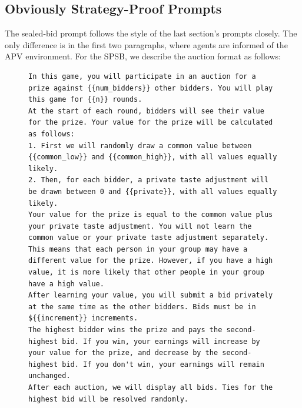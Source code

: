 \documentclass{article} %
\begin{document}
\subsection{Obviously Strategy-Proof Prompts}\label{sec:osp-prompts}
The sealed-bid prompt follows the style of the last section's prompts closely. The only difference is in the first two paragraphs, where agents are informed of the APV environment. For the SPSB, we describe the auction format as follows:
\begin{figure}
\centering
\begin{minipage}{0.95\textwidth}
\begin{lstlisting}
In this game, you will participate in an auction for a prize against {{num_bidders}} other bidders. You will play this game for {{n}} rounds.
At the start of each round, bidders will see their value for the prize. Your value for the prize will be calculated as follows:
1. First we will randomly draw a common value between {{common_low}} and {{common_high}}, with all values equally likely.
2. Then, for each bidder, a private taste adjustment will be drawn between 0 and {{private}}, with all values equally likely.
Your value for the prize is equal to the common value plus your private taste adjustment. You will not learn the common value or your private taste adjustment separately. This means that each person in your group may have a different value for the prize. However, if you have a high value, it is more likely that other people in your group have a high value.
After learning your value, you will submit a bid privately at the same time as the other bidders. Bids must be in ${{increment}} increments.
The highest bidder wins the prize and pays the second-highest bid. If you win, your earnings will increase by your value for the prize, and decrease by the second-highest bid. If you don't win, your earnings will remain unchanged.
After each auction, we will display all bids. Ties for the highest bid will be resolved randomly.
\end{lstlisting}
\end{minipage}
\label{fig:sealbid_prompt-4}
\end{figure}
\end{document}
